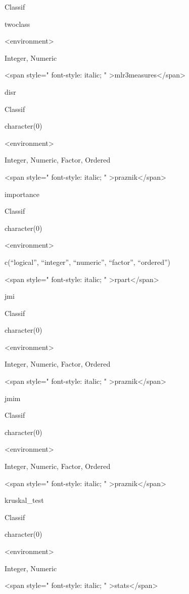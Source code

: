\documentclass[12pt,]{scrbook}
\begin{document}
Classif

twoclass

\textless{}environment\textgreater{}

Integer, Numeric

\textless{}span style=" font-style: italic; " \textgreater{}mlr3measures\textless{}/span\textgreater{}

disr

Classif

character(0)

\textless{}environment\textgreater{}

Integer, Numeric, Factor, Ordered

\textless{}span style=" font-style: italic; " \textgreater{}praznik\textless{}/span\textgreater{}

importance

Classif

character(0)

\textless{}environment\textgreater{}

c(``logical'', ``integer'', ``numeric'', ``factor'', ``ordered'')

\textless{}span style=" font-style: italic; " \textgreater{}rpart\textless{}/span\textgreater{}

jmi

Classif

character(0)

\textless{}environment\textgreater{}

Integer, Numeric, Factor, Ordered

\textless{}span style=" font-style: italic; " \textgreater{}praznik\textless{}/span\textgreater{}

jmim

Classif

character(0)

\textless{}environment\textgreater{}

Integer, Numeric, Factor, Ordered

\textless{}span style=" font-style: italic; " \textgreater{}praznik\textless{}/span\textgreater{}

kruskal\_test

Classif

character(0)

\textless{}environment\textgreater{}

Integer, Numeric

\textless{}span style=" font-style: italic; " \textgreater{}stats\textless{}/span\textgreater{}
\end{document}
